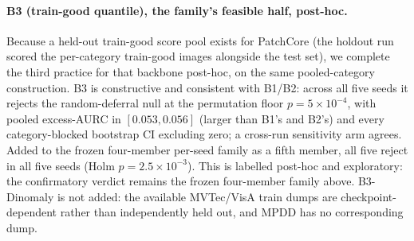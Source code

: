 \documentclass[preprint,11pt]{elsarticle}
\begin{document}
\paragraph{B3 (train-good quantile), the family's feasible half, post-hoc.} Because a held-out
train-good score pool exists for PatchCore (the holdout run scored the per-category
train-good images alongside the test set), we complete the third practice for that backbone
post-hoc, on the same pooled-category construction. B3 is constructive and consistent with B1/B2:
across all five seeds it rejects the random-deferral null at the permutation floor
$p=5\times10^{-4}$, with pooled excess-AURC in $[0.053,0.056]$ (larger than B1's and B2's) and every
category-blocked bootstrap CI excluding zero; a cross-run sensitivity arm agrees. Added to the
frozen four-member per-seed family as a fifth member, all five reject in all five seeds
(Holm $p=2.5\times10^{-3}$). This is labelled post-hoc and exploratory: the confirmatory verdict
remains the frozen four-member family above. B3-Dinomaly is not added: the available
MVTec/VisA train dumps are checkpoint-dependent rather than independently held out, and MPDD
has no corresponding dump.

\begin{table}[!htbp]
  \centering
  \small
  \caption{Post-freeze train-side score availability. A cell is one (category, seed)
  score pool; $n$ is the number of train-side or held-out-good scores in that cell. The Dinomaly
  rows are checkpoint-dependent practice sensitivities, not fresh G2 calibration pools or members
  of the confirmatory B3 family. The VisA PatchCore row is an independent holdout because those
  images were excluded from the memory bank.}
  \label{tab:x1trainside}
\end{table}
\end{document}
